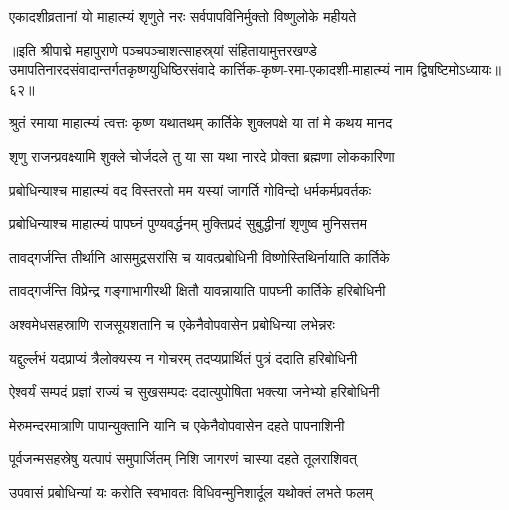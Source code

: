 \twolineshloka
{एकादशीव्रतानां यो माहात्म्यं शृणुते नरः}
{सर्वपापविनिर्मुक्तो विष्णुलोके महीयते}%

॥इति श्रीपाद्मे महापुराणे पञ्चपञ्चाशत्साहस्र्यां संहितायामुत्तरखण्डे उमापतिनारदसंवादान्तर्गतकृष्णयुधिष्ठिरसंवादे कार्त्तिक-कृष्ण-रमा-एकादशी-माहात्म्यं नाम द्विषष्टिमोऽध्यायः॥६२॥


\hyperref[sec:ekadashi_mahatmyam_padma_puranam]{\closesub}
\clearpage

\label{sec:padma-karttika-shukla-prabodhini}



\twolineshloka
{श्रुतं रमाया माहात्म्यं त्वत्तः कृष्ण यथातथम्}
{कार्तिके शुक्लपक्षे या तां मे कथय मानद}%


\twolineshloka
{शृणु राजन्प्रवक्ष्यामि शुक्ले चोर्जदले तु या}
{सा यथा नारदे प्रोक्ता ब्रह्मणा लोककारिणा}%


\twolineshloka
{प्रबोधिन्याश्च माहात्म्यं वद विस्तरतो मम}
{यस्यां जागर्ति गोविन्दो धर्मकर्मप्रवर्तकः}%


\twolineshloka
{प्रबोधिन्याश्च माहात्म्यं पापघ्नं पुण्यवर्द्धनम्}
{मुक्तिप्रदं सुबुद्धीनां शृणुष्व मुनिसत्तम}%

\twolineshloka
{तावद्गर्जन्ति तीर्थानि आसमुद्रसरांसि च}
{यावत्प्रबोधिनी विष्णोस्तिथिर्नायाति कार्तिके}%

\twolineshloka
{तावद्गर्जन्ति विप्रेन्द्र गङ्गाभागीरथी क्षितौ}
{यावन्नायाति पापघ्नी कार्तिके हरिबोधिनी}%

\twolineshloka
{अश्वमेधसहस्राणि राजसूयशतानि च}
{एकेनैवोपवासेन प्रबोधिन्या लभेन्नरः}%

\twolineshloka
{यद्दुर्ल्लभं यदप्राप्यं त्रैलोक्यस्य न गोचरम्}
{तदप्यप्रार्थितं पुत्रं ददाति हरिबोधिनी}%

\twolineshloka
{ऐश्वर्यं सम्पदं प्रज्ञां राज्यं च सुखसम्पदः}
{ददात्युपोषिता भक्त्या जनेभ्यो हरिबोधिनी}%

\twolineshloka
{मेरुमन्दरमात्राणि पापान्युक्तानि यानि च}
{एकेनैवोपवासेन दहते पापनाशिनी}%

\twolineshloka
{पूर्वजन्मसहस्रेषु यत्पापं समुपार्जितम्}
{निशि जागरणं चास्या दहते तूलराशिवत्}%

\twolineshloka
{उपवासं प्रबोधिन्यां यः करोति स्वभावतः}
{विधिवन्मुनिशार्दूल यथोक्तं लभते फलम्}%

